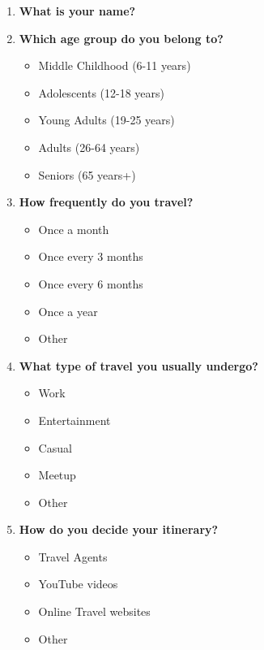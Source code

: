 \documentclass[final,3p,times,authoryear]{elsarticle}
\begin{document}
    \begin{enumerate}
        \item \textbf{What is your name?}

        \item \textbf{Which age group do you belong to?}
        \begin{itemize}
            \item Middle Childhood (6-11 years)
            \item Adolescents (12-18 years)
            \item Young Adults (19-25 years)
            \item Adults (26-64 years)
            \item Seniors (65 years+)
        \end{itemize}

        \item \textbf{How frequently do you travel?}
        \begin{itemize}
            \item Once a month
            \item Once every 3 months
            \item Once every 6 months
            \item Once a year
            \item Other
        \end{itemize}

        \item \textbf{What type of travel you usually undergo?}
        \begin{itemize}
            \item Work
            \item Entertainment
            \item Casual
            \item Meetup
            \item Other
        \end{itemize}

        \item \textbf{How do you decide your itinerary?}
        \begin{itemize}
            \item Travel Agents
            \item YouTube videos
            \item Online Travel websites
            \item Other
        \end{itemize}


\end{enumerate}
\end{document}
